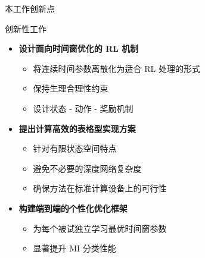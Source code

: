 \begin{frame}{本工作创新点}
    \begin{exampleblock}{\normalsize 创新性工作}
        \begin{itemize}
            \item[\textcolor{primaryblue}{\textbullet}] \textbf{设计面向时间窗优化的 RL 机制}
            \begin{itemize}
                \item 将连续时间参数离散化为适合 RL 处理的形式
                \item 保持生理合理性约束
                \item 设计状态 - 动作 - 奖励机制
            \end{itemize}

            \vspace{0.5em}
            \item[\textcolor{primaryblue}{\textbullet}] \textbf{提出计算高效的表格型实现方案}
            \begin{itemize}
                \item 针对有限状态空间特点
                \item 避免不必要的深度网络复杂度
                \item 确保方法在标准计算设备上的可行性
            \end{itemize}

            \vspace{0.5em}
            \item[\textcolor{primaryblue}{\textbullet}] \textbf{构建端到端的个性化优化框架}
            \begin{itemize}
                \item 为每个被试独立学习最优时间窗参数
                \item 显著提升 MI 分类性能
            \end{itemize}
        \end{itemize}
    \end{exampleblock}
\end{frame}
